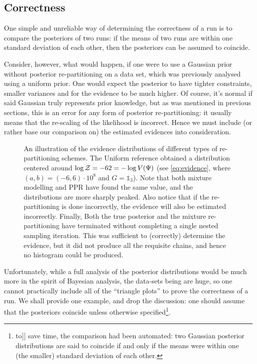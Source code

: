 \documentclass[usenatbib]{mnras}
\begin{document}
\subsection{Correctness}
\label{sec:org8a15079}
One simple and unreliable way of determining the correctness of a
run is to compare the posteriors of two runs: if the means of two
runs are within one standard deviation of each other, then the
posteriors can be assumed to coincide.

Consider, however, what would happen, if one were to use a Gaussian
prior without posterior re-partitioning on a data set, which was
previously analysed using a uniform prior. One would expect the
posterior to have tighter constraints, smaller variances and for
the evidence to be much higher. Of course, it's normal if said
Gaussian truly represents prior knowledge, but as was mentioned in
previous sections, this is an error for any form of posterior
re-partitioning: it usually means that the re-scaling of the
likelihood is incorrect. Hence we must include (or rather base our
comparison on) the estimated evidences into consideration.

\begin{figure}

\caption{\label{org790dfb3}
An illustration of the evidence distributions of different types of re-partitioning schemes. The Uniform reference obtained a distribution centered around \(\log {\cal Z} = -62 = - \log V(\Psi)\) (see \autoref{eq:evidence}, where \((a,b)=(-6, 6)\cdot 10^{8}\) and \(G=\mathds{1}_{3}\)). Note that both mixture modelling and PPR have found the same value, and the distributions are more sharply peaked. Also notice that if the re-partitioning is done incorrectly, the evidence will also be estimated incorrectly. Finally, Both the true posterior and the mixture re-partitioning have terminated without completing a single nested sampling iteration. This was sufficient to (correctly) determine the evidence, but it did not produce all the requisite chains, and hence no histogram could be produced.}
\end{figure}

Unfortunately, while a full analysis of the posterior distributions
would be much more in the spirit of Bayesian analysis, the data-sets
being are huge, so one cannot practically include all of
the ``triangle plots'' to prove the correctness of a run. We shall
provide one example, and drop the discussion: one should assume
that the posteriors coincide unless otherwise specified\footnote{to]] save time, the comparison had been automated: two Gaussian
posterior distributions are said to coincide if and only if the means
were within one (the smaller) standard deviation  of each
other.}. 
\end{document}
